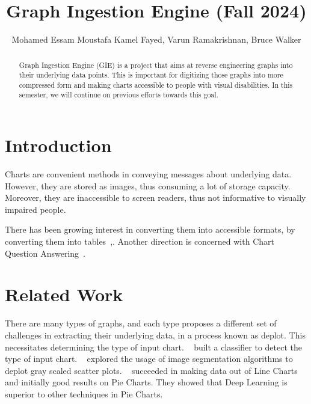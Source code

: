 \documentclass[
	letterpaper, %
]{jdf}
\author{Mohamed Essam Moustafa Kamel Fayed, Varun Ramakrishnan, Bruce Walker}
\title{Graph Ingestion Engine (Fall 2024)}
\begin{document}

\maketitle

\begin{abstract}

    Graph Ingestion Engine (GIE) is a project that aims at reverse engineering graphs into their underlying data points.
    This is important for digitizing those graphs into more compressed form and making charts accessible to people with visual disabilities.
    In this semester, we will continue on previous efforts towards this goal.
\end{abstract}

\section{Introduction}\label{sect:introduction}

Charts are convenient methods in conveying messages about underlying data.
However, they are stored as images, thus consuming a lot of storage capacity.
Moreover, they are inaccessible to screen readers, thus not informative to visually impaired people.

There has been growing interest in converting them into accessible formats, by converting them into tables~\cite{liu2022deplot},. 
Another direction is concerned with Chart Question Answering~\cite{masry2022chartqa,masry2024chartgemma}.


\section{Related Work}
\label{sect:related}
There are many types of graphs, and each type proposes a different set of challenges in extracting their underlying data, in a process known as deplot.
This necessitates determining the type of input chart.
~\cite{dsouza2023} built a classifier to detect the type of input chart.
~\cite{dsouza2022} explored the usage of image segmentation algorithms to deplot gray scaled scatter plots.
~\cite{dsouza2023} succeeded in making data out of Line Charts and initially good results on Pie Charts.
They showed that Deep Learning is superior to other techniques in Pie Charts.
\end{document}

